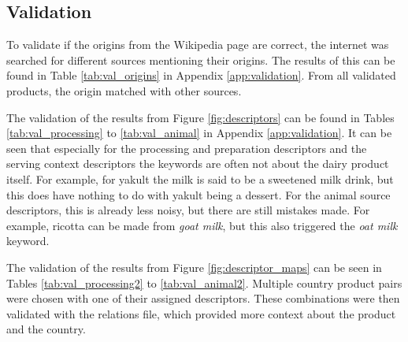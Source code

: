 \documentclass[sigconf]{acmart-txmm}
\begin{document}
\subsection{Validation}
To validate if the origins from the Wikipedia page are correct, the internet was searched for different sources mentioning their origins. 
The results of this can be found in Table \ref{tab:val_origins} in Appendix \ref{app:validation}.
From all validated products, the origin matched with other sources.

The validation of the results from Figure \ref{fig:descriptors} can be found in Tables \ref{tab:val_processing} to \ref{tab:val_animal} in Appendix \ref{app:validation}.
It can be seen that especially for the processing and preparation descriptors and the serving context descriptors the keywords are often not about the dairy product itself.
For example, for yakult the milk is said to be a sweetened milk drink, but this does have nothing to do with yakult being a dessert. 
For the animal source descriptors, this is already less noisy, but there are still mistakes made. 
For example, ricotta can be made from \emph{goat milk}, but this also triggered the \emph{oat milk} keyword. 

The validation of the results from Figure \ref{fig:descriptor_maps} can be seen in Tables \ref{tab:val_processing2} to \ref{tab:val_animal2}.
Multiple country product pairs were chosen with one of their assigned descriptors. 
These combinations were then validated with the relations file, which provided more context about the product and the country. 


\end{document}
